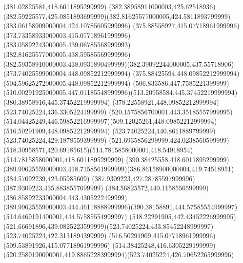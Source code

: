 {{        \lineto(381.02825581,418.6011895299999)
        \closepath
        \moveto(382.38958911000003,425.62518936)
        \curveto(382.59225577,425.0851893699999)(382.81625577000005,424.5811893799999)(383.06158909000004,424.10785605999996)
        \lineto(375.88558927,415.07718961999996)
        \lineto(373.73358933000003,415.07718961999996)
        \closepath
        \moveto(383.05892243000005,439.06785568999993)
        \curveto(382.81625577000005,438.59585569999996)(382.59358910000003,438.0931890499999)(382.39092244000005,437.55718906)
        \lineto(373.74025599000004,448.09852212999994)
        \lineto(375.88425594,448.09852212999994)
        \closepath
        \moveto(504.59625272000005,448.09852212999994)
        \curveto(506.833586,447.7585221399999)(510.00291925000005,447.01185548999996)(513.20958584,445.37452219999994)
        \lineto(380.38958916,445.37452219999994)
        \lineto(378.22558921,448.09852212999994)
        \closepath
        \moveto(523.74025224,436.3305224199999)
        \curveto(520.1575856700001,443.35185557999995)(514.04425249,446.59852216999997)(509.12025261,448.09852212999994)
        \lineto(516.50291909,448.09852212999994)
        \lineto(523.74025224,440.8611889799999)
        \closepath
        \moveto(523.74025224,429.1878559399999)
        \curveto(521.6935856299999,424.0238560599999)(518.30958571,420.69185615)(514.7815858000001,418.54918954)
        \lineto(514.7815858000001,418.6011895299999)
        \lineto(390.38425558,418.6011895299999)
        \curveto(389.99625559000003,418.7158561999999)(386.86158900000004,419.74518951)(384.57092239,423.05985609)
        \lineto(387.9309223,427.28785597999996)
        \lineto(387.9309223,435.8838557699999)
        \lineto(384.56825572,440.1158556599999)
        \curveto(386.85892233000004,443.4305222499999)(389.99625559000003,444.46118888999996)(390.38158891,444.57585554999997)
        \lineto(514.6469191400001,444.57585554999997)
        \curveto(518.22291905,442.43452226999995)(521.66691896,439.0825223599999)(523.74025224,433.85452248999997)
        \closepath
        \moveto(523.74025224,422.3131894399999)
        \lineto(516.50291909,415.07718961999996)
        \lineto(509.53891926,415.07718961999996)
        \curveto(514.38425248,416.6305229199999)(520.2589190000001,419.88652283999994)(523.74025224,426.70652265999996)
        \closepath
}
}
